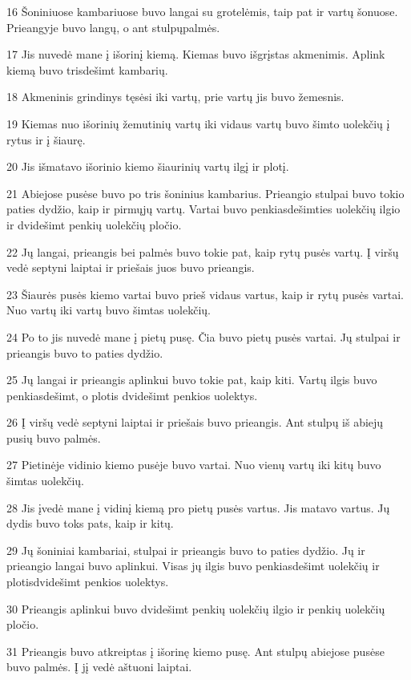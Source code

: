 \par 16 Šoniniuose kambariuose buvo langai su grotelėmis, taip pat ir vartų šonuose. Prieangyje buvo langų, o ant stulpų­palmės. 
\par 17 Jis nuvedė mane į išorinį kiemą. Kiemas buvo išgrįstas akmenimis. Aplink kiemą buvo trisdešimt kambarių. 
\par 18 Akmeninis grindinys tęsėsi iki vartų, prie vartų jis buvo žemesnis. 
\par 19 Kiemas nuo išorinių žemutinių vartų iki vidaus vartų buvo šimto uolekčių į rytus ir į šiaurę. 
\par 20 Jis išmatavo išorinio kiemo šiaurinių vartų ilgį ir plotį. 
\par 21 Abiejose pusėse buvo po tris šoninius kambarius. Prieangio stulpai buvo tokio paties dydžio, kaip ir pirmųjų vartų. Vartai buvo penkiasdešimties uolekčių ilgio ir dvidešimt penkių uolekčių pločio. 
\par 22 Jų langai, prieangis bei palmės buvo tokie pat, kaip rytų pusės vartų. Į viršų vedė septyni laiptai ir priešais juos buvo prieangis. 
\par 23 Šiaurės pusės kiemo vartai buvo prieš vidaus vartus, kaip ir rytų pusės vartai. Nuo vartų iki vartų buvo šimtas uolekčių. 
\par 24 Po to jis nuvedė mane į pietų pusę. Čia buvo pietų pusės vartai. Jų stulpai ir prieangis buvo to paties dydžio. 
\par 25 Jų langai ir prieangis aplinkui buvo tokie pat, kaip kiti. Vartų ilgis buvo penkiasdešimt, o plotis­ dvidešimt penkios uolektys. 
\par 26 Į viršų vedė septyni laiptai ir priešais buvo prieangis. Ant stulpų iš abiejų pusių buvo palmės. 
\par 27 Pietinėje vidinio kiemo pusėje buvo vartai. Nuo vienų vartų iki kitų buvo šimtas uolekčių. 
\par 28 Jis įvedė mane į vidinį kiemą pro pietų pusės vartus. Jis matavo vartus. Jų dydis buvo toks pats, kaip ir kitų. 
\par 29 Jų šoniniai kambariai, stulpai ir prieangis buvo to paties dydžio. Jų ir prieangio langai buvo aplinkui. Visas jų ilgis buvo penkiasdešimt uolekčių ir plotis­dvidešimt penkios uolektys. 
\par 30 Prieangis aplinkui buvo dvidešimt penkių uolekčių ilgio ir penkių uolekčių pločio. 
\par 31 Prieangis buvo atkreiptas į išorinę kiemo pusę. Ant stulpų abiejose pusėse buvo palmės. Į jį vedė aštuoni laiptai. 
